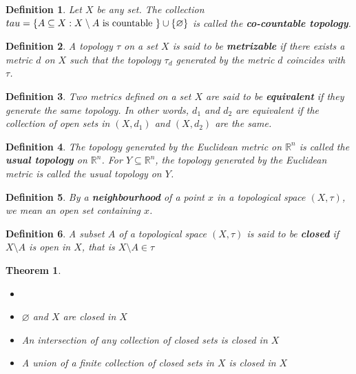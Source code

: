 \documentclass[14pt,twoside]{extreport}
\newtheorem*{defn}{Definition}
\newtheorem*{thm}{Theorem}
\begin{document}
\begin{defn}
    Let $X$ be any set. The collection $\\tau = \left\{ A \subseteq X  :  X \setminus A \text{ is countable } \right\} \cup \left\{ \varnothing \right\}$ is called the \textbf{co-countable topology}.
\end{defn}



\begin{defn}
A topology $\tau$ on a set $X$ is said to be \textbf{metrizable} if there exists a metric $d$ on $X$ such that the topology $\tau_d$ generated by the metric $d$ coincides with $\tau$.
\end{defn}

\begin{defn}
Two metrics defined on a set $X$ are said to be \textbf{equivalent} if they generate the same topology. 
In other words, $d_1$ and $d_2$ are equivalent if the collection of open sets in $\left (X, d_1\right )$ and $\left (X, d_2\right )$ are the same.
\end{defn}

\begin{defn}
The topology generated by the Euclidean metric on $\mathbb{R} ^n$ is called the \textbf{usual topology} on $\mathbb{R} ^n$.
For $Y \subseteq \mathbb{R} ^n$, the topology generated by the Euclidean metric is called the usual topology on $Y$.
\end{defn}

\begin{defn}
By a \textbf{neighbourhood} of a point $x$ in a topological space $\left (X, \tau\right )$, we mean an open set containing $x$.
\end{defn}

\begin{defn}
A subset $A$ of a topological space $\left (X, \tau\right )$ is said to be \textbf{closed} if $X \setminus A$ is open in $X$, that is $X \setminus A \in \tau$
\end{defn}

\begin{thm}
    \begin{itemize}
        \item[]
        \item  $\varnothing$ and $X$ are closed in $X$
        \item An intersection of any collection of closed sets is closed in $X$
        \item A union of a \textit{finite} collection of closed sets in $X$ is closed in $X$
    \end{itemize}
\end{thm}
\end{document}
